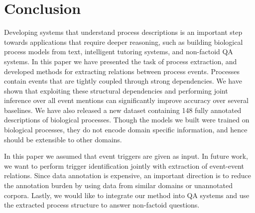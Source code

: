 \section{Conclusion}

Developing systems that understand process descriptions is an important step towards applications that require deeper reasoning, such as building biological process models from text, intelligent tutoring systems, and non-factoid QA systems. In this paper we have presented the task of process extraction, and developed methods for extracting relations between process events. Processes contain events that are  tightly coupled through strong dependencies. We have shown that  exploiting these structural dependencies and performing joint inference over all event mentions can significantly improve accuracy over several baselines. We have also released a new dataset containing 148 fully annotated descriptions of biological processes. Though the models we built were trained on biological processes, they do not encode domain specific information, and hence should be extensible to other domains.

In this paper we assumed that event triggers are given as input. In future work, we want to perform trigger identification jointly with extraction of event-event relations. Since data annotation is expensive, an important direction is to reduce the annotation burden by using data from similar domains or unannotated corpora. Lastly, we would like to integrate our method into QA systems and use the extracted process structure to answer non-factoid questions. 
